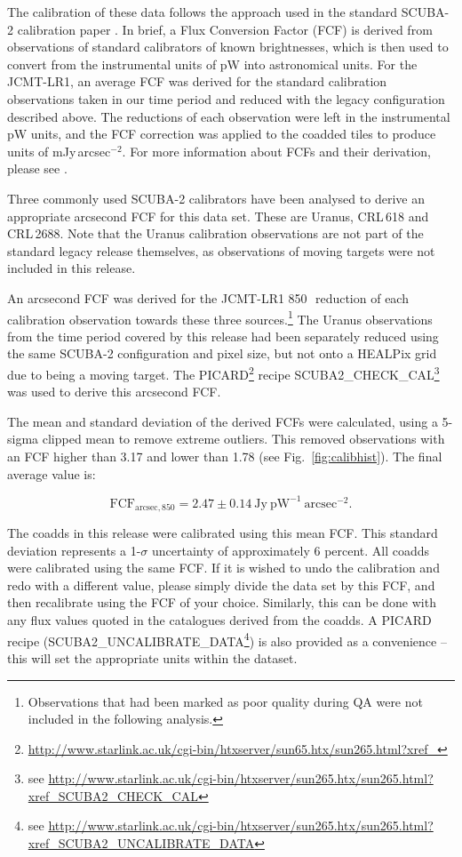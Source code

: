 \documentclass[usenatbib]{mnras}
\begin{document}
The calibration of these data follows the approach used in the
standard SCUBA-2 calibration paper \citep{Dempsey2013}. In brief, a
Flux Conversion Factor (FCF) is derived from observations of standard
calibrators of known brightnesses, which is then used to convert from
the instrumental units of pW into astronomical units. For the
JCMT-LR1, an average FCF was derived for the standard calibration
observations taken in our time period and reduced with the legacy
configuration described above.  The reductions of each observation
were left in the instrumental pW units, and the FCF correction was
applied to the coadded tiles to produce units of
mJy\,arcsec$^{-2}$. For more information about FCFs and their
derivation, please see \citet{Dempsey2013}.

Three commonly used SCUBA-2 calibrators have been analysed to derive
an appropriate arcsecond FCF for this data set. These are Uranus,
CRL\,618 and CRL\,2688. Note that the Uranus calibration observations
are not part of the standard legacy release themselves, as
observations of moving targets were not included in this release.

An arcsecond FCF was derived for the JCMT-LR1 850\,\micron\ reduction
of each calibration observation towards these three
sources.\footnote{Observations that had been marked as poor quality
  during QA were not included in the following analysis.}  The Uranus
observations from the time period covered by this release had been
separately reduced using the same SCUBA-2 configuration and pixel
size, but not onto a HEALPix grid due to being a moving target. The
PICARD\footnote{\url{http://www.starlink.ac.uk/cgi-bin/htxserver/sun65.htx/sun265.html?xref_}}
recipe SCUBA2\_CHECK\_CAL\footnote{see
  \url{http://www.starlink.ac.uk/cgi-bin/htxserver/sun265.htx/sun265.html?xref_SCUBA2_CHECK_CAL}}
was used to derive this arcsecond FCF.

The mean and standard deviation of the derived FCFs were calculated,
using a 5-sigma clipped mean to remove extreme outliers. This removed
observations with an FCF higher than 3.17 and lower than 1.78 (see
Fig.~\ref{fig:calibhist}). The final average value is:

\begin{equation}
\mathrm{FCF}_{\mathrm{arcsec},850} = 2.47 \pm 0.14\ \mathrm{Jy}\ \mathrm{pW}^{-1}\  \mathrm{arcsec}^{-2}.
\end{equation}

The coadds in this release were calibrated using this mean FCF.  This
standard deviation represents a 1-$\sigma$ uncertainty of
approximately 6 percent. All coadds were calibrated using the same
FCF. If it is wished to undo the calibration and redo with a different
value, please simply divide the data set by this FCF, and then
recalibrate using the FCF of your choice. Similarly, this can be done
with any flux values quoted in the catalogues derived from the
coadds. A PICARD recipe (SCUBA2\_UNCALIBRATE\_DATA\footnote{see
  \url{http://www.starlink.ac.uk/cgi-bin/htxserver/sun265.htx/sun265.html?xref_SCUBA2_UNCALIBRATE_DATA}})
is also provided as a convenience -- this will set the appropriate
units within the dataset.
\end{document}
